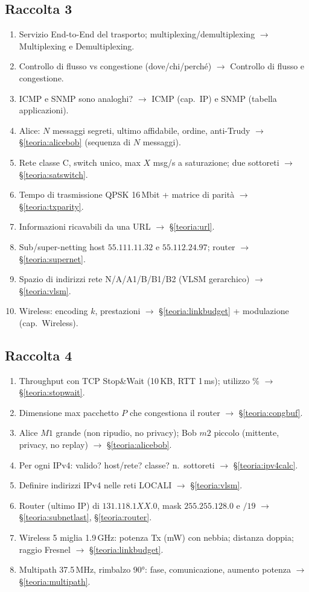 \documentclass[11pt,a4paper]{report}
\begin{document}
\subsection*{Raccolta 3}
\begin{enumerate}[noitemsep]
\item Servizio End-to-End del trasporto; multiplexing/demultiplexing $\to$ Multiplexing e Demultiplexing.
\item Controllo di flusso vs congestione (dove/chi/perché) $\to$ Controllo di flusso e congestione.
\item ICMP e SNMP sono analoghi? $\to$ ICMP (cap.\ IP) e SNMP (tabella applicazioni).
\item Alice: $N$ messaggi segreti, ultimo affidabile, ordine, anti-Trudy $\to$ \S\ref{teoria:alicebob} (sequenza di $N$ messaggi).
\item Rete classe C, switch unico, max $X$ msg/s a saturazione; due sottoreti $\to$ \S\ref{teoria:satswitch}.
\item Tempo di trasmissione QPSK 16\,Mbit + matrice di parità $\to$ \S\ref{teoria:txparity}.
\item Informazioni ricavabili da una URL $\to$ \S\ref{teoria:url}.
\item Sub/super-netting host $55.111.11.32$ e $55.112.24.97$; router $\to$ \S\ref{teoria:supernet}.
\item Spazio di indirizzi rete N/A/A1/B/B1/B2 (VLSM gerarchico) $\to$ \S\ref{teoria:vlsm}.
\item Wireless: encoding $k$, prestazioni $\to$ \S\ref{teoria:linkbudget} + modulazione (cap.\ Wireless).
\end{enumerate}

\subsection*{Raccolta 4}
\begin{enumerate}[noitemsep]
\item Throughput con TCP Stop\&Wait (10\,KB, RTT 1\,ms); utilizzo \% $\to$ \S\ref{teoria:stopwait}.
\item Dimensione max pacchetto $P$ che congestiona il router $\to$ \S\ref{teoria:congbuf}.
\item Alice $M1$ grande (non ripudio, no privacy); Bob $m2$ piccolo (mittente, privacy, no replay) $\to$ \S\ref{teoria:alicebob}.
\item Per ogni IPv4: valido? host/rete? classe? n.\ sottoreti $\to$ \S\ref{teoria:ipv4calc}.
\item Definire indirizzi IPv4 nelle reti LOCALI $\to$ \S\ref{teoria:vlsm}.
\item Router (ultimo IP) di $131.118.1XX.0$, mask $255.255.128.0$ e $/19$ $\to$ \S\ref{teoria:subnetlast}, \S\ref{teoria:router}.
\item Wireless 5 miglia 1.9\,GHz: potenza Tx (mW) con nebbia; distanza doppia; raggio Fresnel $\to$ \S\ref{teoria:linkbudget}.
\item Multipath 37.5\,MHz, rimbalzo 90°: fase, comunicazione, aumento potenza $\to$ \S\ref{teoria:multipath}.
\end{enumerate}
\end{document}
